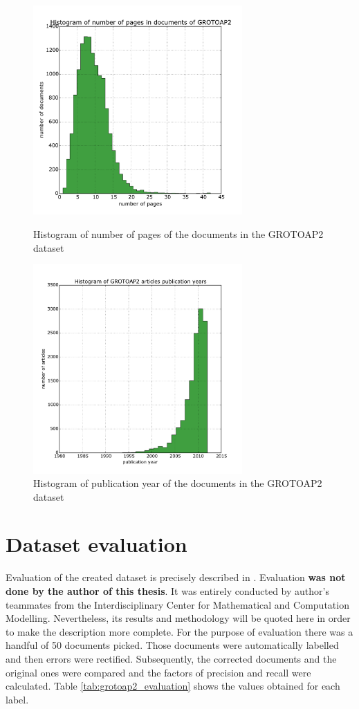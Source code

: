 \begin{figure}
  \centering
\begin{minipage}[t!]{0.45\linewidth}
  \includegraphics[width=8cm]{plots/pages_histogram}
  \caption{Histogram of number of pages of the documents in the GROTOAP2 dataset}
  \label{fig:page_count_histogram}
\end{minipage}
\quad
\begin{minipage}[t!]{0.45\linewidth}
  \includegraphics[width=8cm]{plots/publication_year_histogram}
  \caption{Histogram of publication year of the documents in the GROTOAP2 dataset}
  \label{fig:publication_year_histogram}
\end{minipage}
\end{figure}

\section{Dataset evaluation}
Evaluation of the created dataset is precisely described in \cite{DominikaTkaczykPaweSzostek2014}. Evaluation \textbf{was not done by the author of this thesis}. It was entirely conducted by author's teammates from the Interdisciplinary Center for Mathematical and Computation Modelling. Nevertheless, its results and methodology will be quoted here in order to make the description more complete.
\quad
For the purpose of evaluation there was a handful of 50 documents picked. Those documents were automatically labelled and then errors were rectified. Subsequently, the corrected documents and the original ones were compared and the factors of precision and recall were calculated. Table \ref{tab:grotoap2_evaluation} shows the values obtained for each label.

